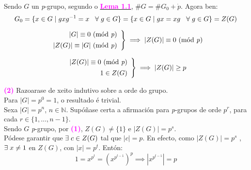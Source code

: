 \documentclass[twoside]{report}
\newcommand{\magbf}[1]{\textcolor{magenta}{\textbf{#1}}} %
\theoremstyle{mystyle}
\begin{document}
\noindent Sendo $G$ un \textit{p}-grupo, segundo o \hyperref[lem1.1]{\magbf{Lema 1.1}}, $\#G = \#G_{0} + \dot{p}$. Agora ben:
$$G_{0} = \{x \in G \hspace{1mm} | \hspace{1mm} gxg^{-1} = x \hspace{3mm} \forall \hspace{1mm} g \in G\} = \{x \in G \hspace{1mm} | \hspace{1mm} gx = xg \hspace{3mm} \forall \hspace{1mm} g \in G\} = Z(G)$$

    \[ 
    \left. \begin{array}{r} 
    |G| \equiv 0 \text{ (mód \textit{p})} \\[1ex]
    |Z(G)| \equiv |G| \text{ (mód \textit{p})}
    \end{array} \right\} 
    \implies |Z(G)| \equiv 0 \text{ (mód \textit{p})}\\
    \]
    
\vspace{5mm}
    
    \[ 
    \left. \begin{array}{r} 
    |Z(G)| \equiv 0 \text{ (mód \textit{p})} \\[1ex]
    1 \in Z(G)
    \end{array} \right\} 
    \implies |Z(G)| \geq p\\
    \]
    
\vspace{5mm}

\noindent \magbf{(2)} Razoarase de xeito indutivo sobre a orde do grupo.\\

\noindent Para $|G| = p^{0} = 1$, o resultado é trivial.\\

\noindent Sexa $|G| = p^{n}$,  $n \in \mathbb{N}$. Supóñase certa a afirmación para \textit{p}-grupos de orde $p^{r}$, para cada $r \in \{1, \dots, n-1\}$. \\

\noindent Sendo $G$ \textit{p}-grupo, por \magbf{(1)}, $Z(G) \neq \{1\}$ e $|Z(G)| = p^{s}$.\\

\noindent Pódese garantir que $\exists \hspace{1mm} c \in Z(G)$ tal que $|c| = p$. En efecto, como $|Z(G)| = p^{s}$
, $\exists \hspace{1mm} x \neq 1$ en $Z(G)$, con $|x| = p^{t}$. Entón:
$$1 = x^{p^{t}} = (x^{p^{t-1}})^{p} \implies |x^{p^{t-1}}| = p$$
\end{document}
